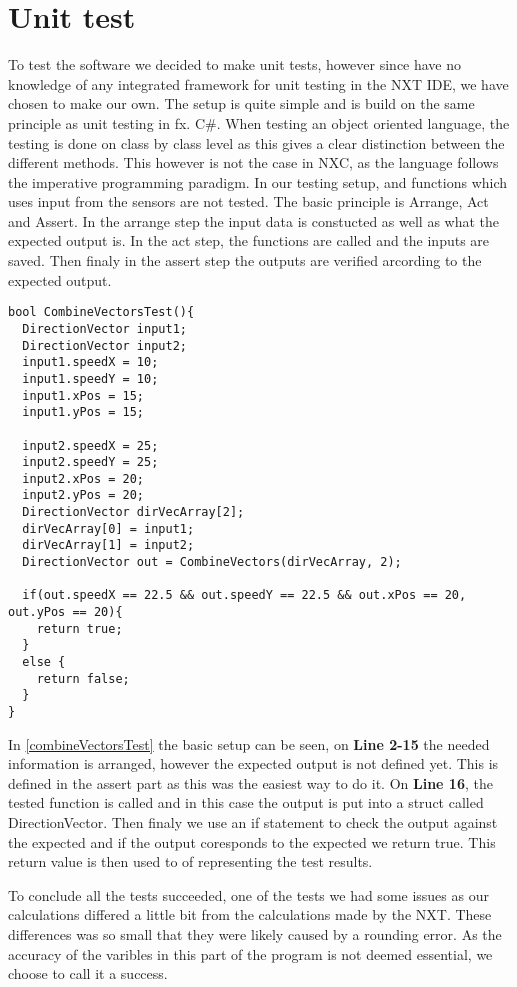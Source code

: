 \chapter{Unit test}

To test the \name software we decided to make unit tests, however since have no
knowledge of any integrated framework for unit testing in the NXT IDE, we
have chosen to make our own. The setup is quite simple and is build on the same
principle as unit testing in fx. C\#. When testing an object oriented
language, the testing is done on class by class level as this gives a clear
distinction between the different methods. This however is not the case in NXC,
as the language follows the imperative programming paradigm. In our testing
setup,  and functions which uses input from the sensors are not tested. The basic principle is Arrange, Act and
Assert. In the arrange step the input data is constucted as well as what the
expected output is. In the act step, the functions are called and the inputs are
saved. Then finaly in the assert step the outputs are verified arcording to the
expected output. \nl

\begin{minipage}[H]{\linewidth}
\begin{lstlisting}[caption =Unit Test for Combine Vectors,label=combineVectorsTest] 
bool CombineVectorsTest(){
  DirectionVector input1;
  DirectionVector input2;
  input1.speedX = 10;
  input1.speedY = 10;
  input1.xPos = 15;
  input1.yPos = 15;
  
  input2.speedX = 25;
  input2.speedY = 25;
  input2.xPos = 20;
  input2.yPos = 20;
  DirectionVector dirVecArray[2];
  dirVecArray[0] = input1;
  dirVecArray[1] = input2;
  DirectionVector out = CombineVectors(dirVecArray, 2);
  
  if(out.speedX == 22.5 && out.speedY == 22.5 && out.xPos == 20, out.yPos == 20){
    return true;
  }
  else {
    return false;
  }
}
\end{lstlisting}
\end{minipage}

In \autoref{combineVectorsTest} the basic setup can be seen, on \textbf{Line
2-15} the needed information is arranged, however the expected output is not
defined yet. This is defined in the assert part as this was the easiest way to
do it. On \textbf{Line 16}, the tested function is called and in this case the
output is put into a struct called DirectionVector. Then finaly we use an if
statement to check the output against the expected and if the output coresponds
to the expected we return true. This return value is then used to of representing the test
results.
\nl


To conclude all the tests succeeded, one of the tests we had some issues as our
calculations differed a little bit from the calculations made by the NXT. These
differences was so small that they were likely caused by a rounding error. As
the accuracy of the varibles in this part of the program is not deemed
essential, we choose to call it a success.
